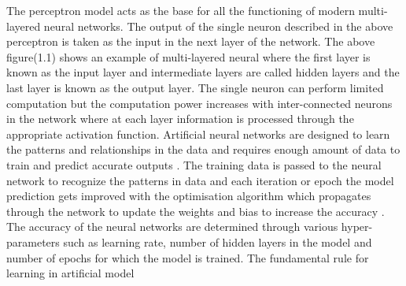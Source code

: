 The perceptron model acts as the base for all the functioning of modern multi-layered neural networks.
The output of the single neuron described in the above perceptron is taken as the input in the next layer of the network. The above figure(1.1) shows an example of multi-layered neural where the first layer is known 
as the input layer and intermediate layers are called hidden layers and the last layer is known as the output layer.
The single neuron can perform limited computation but the computation power increases with inter-connected
neurons in the network \citep{AGATONOVICKUSTRIN2000717} where at each layer information is processed through the appropriate activation function. Artificial neural networks are designed to learn the patterns and relationships in the data and requires enough amount of data to train and predict accurate outputs \citep{AGATONOVICKUSTRIN2000717}.
The training data is passed to the neural network to recognize the patterns in data and each iteration or epoch the model prediction gets improved with the optimisation algorithm which propagates through the network to 
update the weights and bias to increase the accuracy \citep{AGATONOVICKUSTRIN2000717}. The accuracy of the neural networks are determined through various hyper-parameters such as learning rate, number of hidden layers in the model and 
number of epochs for which the model is trained. The fundamental rule for learning in artificial model 


